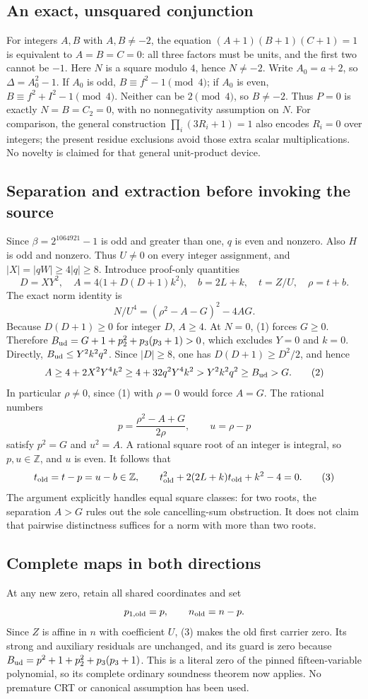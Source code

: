 \subsection{An exact, unsquared conjunction}
For integers $A,B$ with $A,B\ne-2$, the equation
$(A+1)(B+1)(C+1)=1$ is equivalent to $A=B=C=0$: all three factors must be units,
and the first two cannot be $-1$.
Here $N$ is a square modulo $4$, hence $N\ne-2$. Write $A_0=a+2$, so
$\Delta=A_0^2-1$. If $A_0$ is odd, $B\equiv f^2-1\pmod4$; if $A_0$ is even,
$B\equiv f^2+I^2-1\pmod4$. Neither can be $2\pmod4$, so $B\ne-2$.
Thus $P=0$ is exactly $N=B=C_2=0$, with no nonnegativity assumption on $N$.
For comparison, the general construction $\prod_i(3R_i+1)=1$ also encodes
$R_i=0$ over integers; the present residue exclusions avoid those extra scalar
multiplications. No novelty is claimed for that general unit-product device.

\subsection{Separation and extraction before invoking the source}
Since $\beta=2^{1064921}-1$ is odd and greater than one, $q$ is even and nonzero.
Also $H$ is odd and nonzero. Thus $U\ne0$ on every integer assignment, and
$|X|=|qW|\ge4|q|\ge8$.
Introduce proof-only quantities
\[
 D=XY^2,\quad A=4\bigl(1+D(D+1)k^2\bigr),\quad
 b=2L+k,\quad t=Z/U,\quad\rho=t+b.
\]
The exact norm identity is
\[
 N/U^4=(\rho^2-A-G)^2-4AG. \tag{1}
\]
Because $D(D+1)\ge0$ for integer $D$, $A\ge4$. At $N=0$, (1) forces
$G\ge0$. Therefore $B_{\rm ud}=G+1+p_2^2+p_3(p_3+1)>0$, which excludes
$Y=0$ and $k=0$. Directly, $B_{\rm ud}\le Y^2k^2q^2$. Since
$|D|\ge8$, one has $D(D+1)\ge D^2/2$, and hence
\[
 A\ge4+2X^2Y^4k^2\ge4+32q^2Y^4k^2
   >Y^2k^2q^2\ge B_{\rm ud}>G. \tag{2}
\]
In particular $\rho\ne0$, since (1) with $\rho=0$ would force $A=G$.
The rational numbers
\[
 p=\frac{\rho^2-A+G}{2\rho},\qquad u=\rho-p
\]
satisfy $p^2=G$ and $u^2=A$. A rational square root of an integer is integral,
so $p,u\in\mathbb Z$, and $u$ is even. It follows that
\[
 t_{\rm old}=t-p=u-b\in\mathbb Z,\qquad
 t_{\rm old}^2+2(2L+k)t_{\rm old}+k^2-4=0. \tag{3}
\]
The argument explicitly handles equal square classes: for two roots, the
separation $A>G$ rules out the sole cancelling-sum obstruction. It does not
claim that pairwise distinctness suffices for a norm with more than two roots.

\subsection{Complete maps in both directions}
At any new zero, retain all shared coordinates and set
\[
 p_{1,\rm old}=p,\qquad n_{\rm old}=n-p.
\]
Since $Z$ is affine in $n$ with coefficient $U$, (3) makes the old first carrier
zero. Its strong and auxiliary residuals are unchanged, and its guard is zero
because $B_{\rm ud}=p^2+1+p_2^2+p_3(p_3+1)$. This is a literal zero of the
pinned fifteen-variable polynomial, so its complete ordinary soundness theorem
now applies. No premature CRT or canonical assumption has been used.

